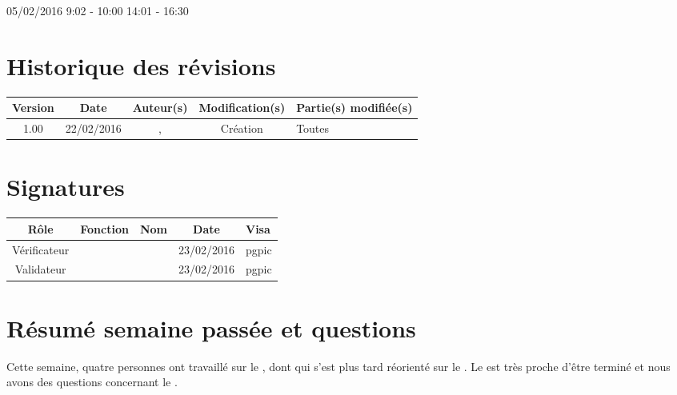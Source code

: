\documentclass [a4paper] {article}
\begin{document}
05/02/2016			 				%
\hfill   
\hfill 	 9:02 - 10:00 	14:01 - 16:30			%


\section*{Historique des révisions}
\begin{center}
			\begin{tabular}{| c | c | c | c | p{4cm} |}
				\hline
				\rowcolor{Gray}
				Version & Date & Auteur(s) & Modification(s) & Partie(s) modifiée(s)		 \\
				\hline
				1.00 & 22/02/2016 & \Pierre, \Kafui & Création & Toutes \\
		\hline		
			\end{tabular}
		\end{center}

\section*{Signatures}

		\begin{center}
			\begin{tabular}{| c | c | c | c | p{4cm} |}
				\hline
				\rowcolor{Gray}
				Rôle & Fonction & Nom & Date & Visa		 \\
				\hline
				Vérificateur & \RGC & \Mathieu & 23/02/2016 & pgpic \\[30pt]
				\hline
				Validateur & \CP & \Sergi & 23/02/2016 & pgpic \\[30pt]	
				\hline
			\end{tabular}
		\end{center}


\section{Résumé semaine passée et questions}
Cette semaine, quatre personnes ont travaillé sur le \DSE{}, dont \Michel{} qui s'est plus tard réorienté sur le \PTV{}. Le \DSECourt{} est très proche d'être terminé et nous avons des questions concernant le \PTVCourt{}.
\end{document}
